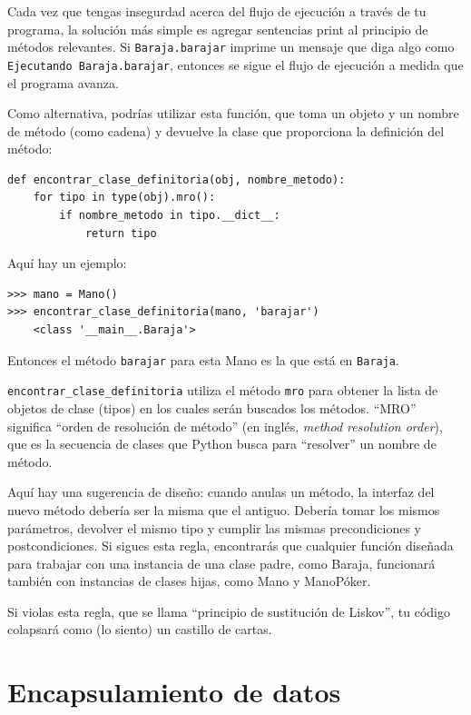 \documentclass[10pt]{book}
\begin{document}
Cada vez que tengas insegurdad acerca del flujo de ejecución a través de tu
programa, la solución más simple es agregar sentencias print al
principio de métodos relevantes.  Si {\tt Baraja.barajar} imprime un
mensaje que diga algo como {\tt Ejecutando Baraja.barajar}, entonces
se sigue el flujo de ejecución a medida que el programa avanza.

Como alternativa, podrías utilizar esta función, que toma un
objeto y un nombre de método (como cadena) y devuelve la clase que
proporciona la definición del método:

\begin{verbatim}
def encontrar_clase_definitoria(obj, nombre_metodo):
    for tipo in type(obj).mro():
        if nombre_metodo in tipo.__dict__:
            return tipo
\end{verbatim}
%
Aquí hay un ejemplo:

\begin{verbatim}
>>> mano = Mano()
>>> encontrar_clase_definitoria(mano, 'barajar')
    <class '__main__.Baraja'>
\end{verbatim}
%
Entonces el método {\tt barajar} para esta Mano es la que está en {\tt Baraja}.

\verb"encontrar_clase_definitoria" utiliza el método {\tt mro} para obtener la lista de
objetos de clase (tipos) en los cuales serán buscados los métodos.  ``MRO''
significa ``orden de resolución de método'' (en inglés, {\em method resolution order}), que es la secuencia de
clases que Python busca para ``resolver'' un nombre de método.

Aquí hay una sugerencia de diseño: cuando anulas un método,
la interfaz del nuevo método debería ser la misma que el antiguo.  Debería
tomar los mismos parámetros, devolver el mismo tipo y cumplir las
mismas precondiciones y postcondiciones.  Si sigues esta regla,
encontrarás que cualquier función diseñada para trabajar con una instancia de una
clase padre, como Baraja, funcionará también con instancias de
clases hijas, como Mano y ManoPóker.

Si violas esta regla, que se llama ``principio de sustitución
de Liskov'', tu código colapsará como (lo siento) un castillo de cartas.


\section{Encapsulamiento de datos}
\end{document}
